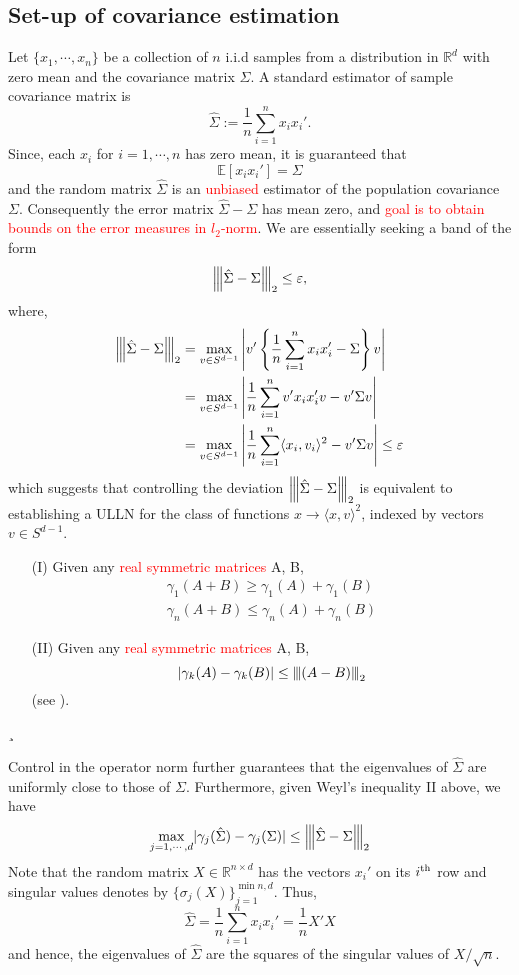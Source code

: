 \documentclass[10pt,handout,english]{beamer}
\newcommand{\ts}{\textsuperscript}
\newcommand{\E}{\mathbb{E}}
\newcommand{\R}{\mathbb{R}}
\newcommand{\vertiii}[1]{{\left\vert\kern-0.25ex\left\vert\kern-0.25ex\left\vert #1 
    \right\vert\kern-0.25ex\right\vert\kern-0.25ex\right\vert}}
\begin{document}
\subsection{Set-up of covariance estimation}
\frame{\tableofcontents[currentsection]}

\begin{frame}[allowframebreaks]
Let $\{x_1,\cdots,x_n\}$ be a collection of $n$ i.i.d samples from a distribution in $\R^d$ with zero mean and the covariance matrix $\Sigma$. A standard estimator of sample covariance matrix is
\[
\hat{\Sigma}:=\frac{1}{n}\sum\limits_{i=1}^{n}x_ix_i'.
\]
Since, each $x_i$ for $i=1,\cdots,n$ has zero mean, it is guaranteed that
\[
\E[x_ix_i']=\Sigma
\]
and the random matrix $\hat{\Sigma}$ is an \textcolor{red}{unbiased} estimator of the population covariance $\Sigma$. Consequently the error matrix $\hat{\Sigma}-\Sigma$ has mean zero, and \textcolor{red}{goal is to obtain bounds on the error measures in $l_2$-norm}. We are essentially seeking a band of the form
\[
\vertiii{\hat{\Sigma}-\Sigma}_2\leq\varepsilon,
\]
where,
\begin{align*}
\vertiii{\hat{\Sigma}-\Sigma}_2&=\max_{v\in S^{d-1}}\left\lvert v'\left\{\frac{1}{n}\sum\limits_{i=1}^{n}x_ix_i'-\Sigma\right\}v \right\rvert\\
&=\max_{v\in S^{d-1}}\left\lvert\frac{1}{n}\sum\limits_{i=1}^{n}v'x_ix_i'v-v'\Sigma v \right\rvert\\
&=\max_{v\in S^{d-1}}\left\lvert\frac{1}{n}\sum\limits_{i=1}^{n}\langle x_i,v_i\rangle^2-v'\Sigma v \right\rvert\leq\varepsilon
\end{align*}
which suggests that controlling the deviation $\vertiii{\hat{\Sigma}-\Sigma}_2$ is equivalent to establishing a ULLN for the class of functions $x\to\langle x,v \rangle^2$, indexed by vectors $v\in S^{d-1}$.

\begin{definition}
\begin{itemize}
\item[(I)]Given any \textcolor{red}{real symmetric matrices} A, B,
\begin{align*}
\gamma_1(A+B)\geq \gamma_1(A)+\gamma_1(B)\\
\gamma_n(A+B)\leq\gamma_n(A)+\gamma_n(B)
\end{align*}
\item[(II)]Given any \textcolor{red}{real symmetric matrices} A, B,
\[
\lvert \gamma_k(A)-\gamma_k(B)\rvert\leq\vertiii{(A-B)}_2
\]
(see \citet{dasgupta2008asymptotic}).
\end{itemize}¸
\end{definition}
Control in the operator norm further guarantees that the eigenvalues of $\hat{\Sigma}$ are uniformly close to those of $\Sigma$. Furthermore, given Weyl's inequality II above, we have
\[
\max_{j=1,\cdots,d}\lvert \gamma_j(\hat{\Sigma})-\gamma_j(\Sigma)\rvert\leq\vertiii{\hat{\Sigma}-\Sigma}_2
\]
Note that the random matrix $X\in\R^{n\times d}$ has the vectors $x_i'$ on its $i\ts{th}$ row and singular values denotes by $\{\sigma_j(X)\}_{j=1}^{\min{n,d}}$. Thus,
\[
\hat{\Sigma}=\frac{1}{n}\sum\limits_{i=1}^n x_ix_i'=\frac{1}{n}X'X
\]
and hence, the eigenvalues of $\hat{\Sigma}$ are the squares of the singular values of $X/\sqrt{n}$.
\end{frame}
\end{document}
